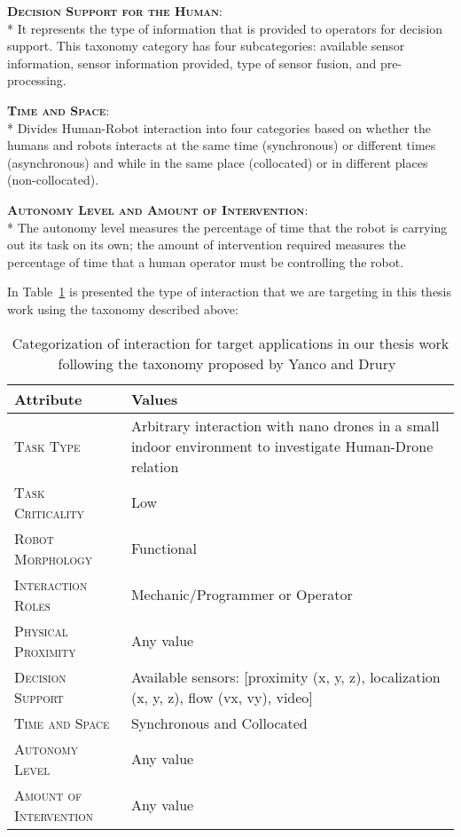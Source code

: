 {\bfseries \scshape Decision Support for the Human}:\\*
It represents the type of information that is provided to operators for decision support. 
This taxonomy category has four subcategories: available sensor information, sensor information provided, type of sensor fusion, and pre-processing.

{\bfseries \scshape Time and Space}:\\*
Divides Human-Robot interaction into four categories based on whether the humans and robots interacts at the same time (synchronous) 
or different times (asynchronous) and while in the same place (collocated) or in different places (non-collocated).

{\bfseries \scshape Autonomy Level and Amount of Intervention}:\\*
The autonomy level measures the percentage of time that the robot is carrying out its task on its own; 
the amount of intervention required measures the percentage of time that a human operator must be controlling the robot.

In Table~\ref{table:taxonomy_target} is presented the type of interaction that we are targeting in this thesis work using the taxonomy described above:

\begin{table}[H]
\centering
    \begin{tabular}{|p{}|m{}|}
    \hline
    \rowcolor{bluepoli!40}
    \textbf{Attribute} & \textbf{Values} \\
    \hline \hline
    {\scshape Task Type} & Arbitrary interaction with nano drones in a small indoor environment to investigate Human-Drone relation \\
    \hline
    {\scshape Task Criticality} & Low \\
    \hline
    {\scshape Robot Morphology} & Functional \\
    \hline
    {\scshape Interaction Roles} & Mechanic/Programmer or Operator \\
    \hline
    {\scshape Physical Proximity} &  Any value \\
    \hline
    {\scshape Decision Support} & Available sensors: [proximity (x, y, z), localization (x, y, z), flow (vx, vy), video] \\
    \hline
    {\scshape Time and Space} & Synchronous and Collocated \\
    \hline
    {\scshape Autonomy Level} & Any value \\
    \hline
    {\scshape Amount of Intervention} & Any value \\
    \hline
    \end{tabular}
    \\[10pt]
    \caption[Taxonomy for interaction of target applications]{Categorization of interaction for target applications in our thesis work following the taxonomy proposed by Yanco and Drury~\cite{yanco2004taxonomy}}\label{table:taxonomy_target}
\end{table}


